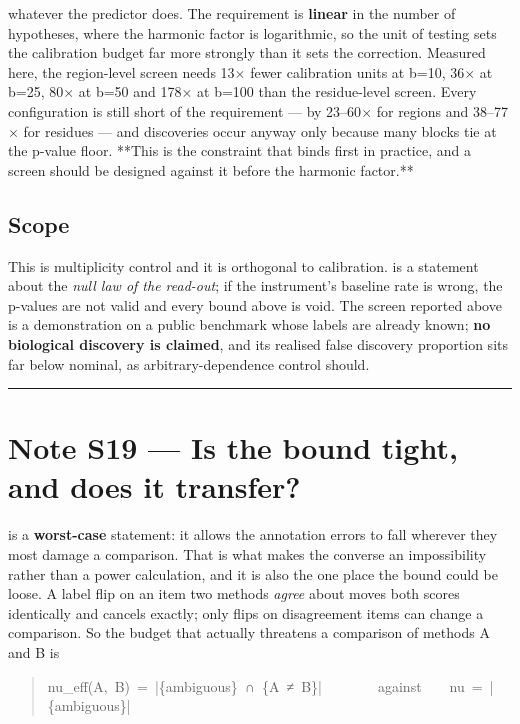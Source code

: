 whatever the predictor does. The requirement is \textbf{linear} in the number of
hypotheses, where the harmonic factor is logarithmic, so the unit of testing
sets the calibration budget far more strongly than it sets the correction.
Measured here, the region-level screen needs 13$\times$ fewer calibration units at
b=10, 36$\times$ at b=25, 80$\times$ at b=50 and 178$\times$ at b=100 than the residue-level screen.
Every configuration is still short of the requirement --- by 23--60$\times$ for regions
and 38--77$\times$ for residues --- and discoveries occur anyway only because many blocks
tie at the p-value floor. **This is the constraint that binds first in practice,
and a screen should be designed against it before the harmonic factor.**


\subsection*{Scope}

This is multiplicity control and it is orthogonal to calibration.
 is a statement about the \emph{null law of the read-out}; if the
instrument's baseline rate is wrong, the p-values are not valid and every bound
above is void. The screen reported above is a demonstration on a public benchmark whose labels
are already known; \textbf{no biological discovery is claimed}, and its realised false
discovery proportion sits far below nominal, as arbitrary-dependence control
should.


\vspace{0.5em}\hrule\vspace{0.8em}



\section*{Note S19 --- Is the bound tight, and does it transfer?}

 is a \textbf{worst-case} statement: it allows the annotation
errors to fall wherever they most damage a comparison. That is what makes the
converse an impossibility rather than a power calculation, and it is also the
one place the bound could be loose. A label flip on an item two methods \emph{agree}
about moves both scores identically and cancels exactly; only flips on
disagreement items can change a comparison. So the budget that actually
threatens a comparison of methods A and B is

\begin{quote}\ttfamily\footnotesize\begin{flushleft}
nu\_eff(A,~B)~=~|\{ambiguous\}~∩~\{A~≠~B\}|~~~~~~~~against~~~~nu~=~|\{ambiguous\}|\\
\end{flushleft}\end{quote}

